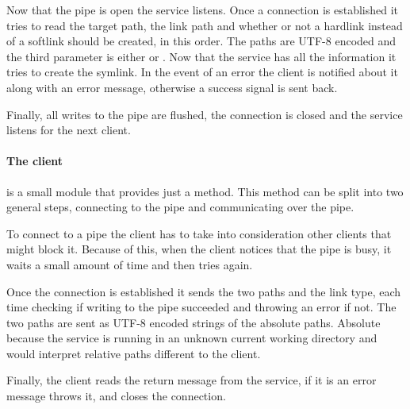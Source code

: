Now that the pipe is open the service listens. Once a connection is established
it tries to read the target path, the link path and whether or not a hardlink
instead of a softlink should be created, in this order. The paths are UTF-8
encoded and the third parameter is either  or .
Now that the service has all the information it tries to create the symlink. In
the event of an error the client is notified about it along with an error
message, otherwise a success signal is sent back.

Finally, all writes to the pipe are flushed, the connection is closed and the
service listens for the next client.

\paragraph{The client} is a small module that provides just a 
method. This method can be split into two general steps, connecting to the pipe
and communicating over the pipe.

To connect to a pipe the client has to take into consideration other clients
that might block it. Because of this, when the client notices that the pipe is
busy, it waits a small amount of time and then tries again.

Once the connection is established it sends the two paths and the link type, each
time checking if writing to the pipe succeeded and throwing an error if not.
The two paths are sent as UTF-8 encoded strings of the absolute paths. Absolute
because the service is running in an unknown current working directory and
would interpret relative paths different to the client.

Finally, the client reads the return message from the service, if it is an
error message throws it, and closes the connection.

